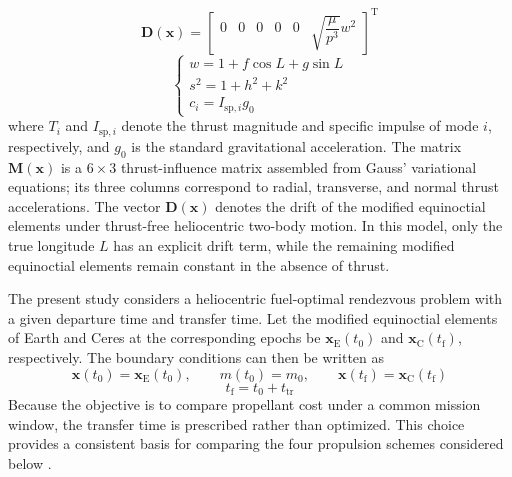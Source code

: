 \documentclass{IEEEtaes}
\begin{document}
\begin{equation}
\bm{D}(\bm{x})=\begin{bmatrix}0&0&0&0&0&\sqrt{\dfrac{\mu}{p^3}}w^2\end{bmatrix}^{\mathrm{T}}
\end{equation}
\begin{equation}
\begin{cases}
w=1+f\cos L+g\sin L\\
s^2=1+h^2+k^2\\
c_i=I_{\mathrm{sp},i}g_0
\end{cases}
\end{equation}
where $T_i$ and $I_{\mathrm{sp},i}$ denote the thrust magnitude and specific impulse of mode $i$, respectively, and $g_0$ is the standard gravitational acceleration. The matrix $\bm{M}(\bm{x})$ is a $6\times3$ thrust-influence matrix assembled from Gauss' variational equations; its three columns correspond to radial, transverse, and normal thrust accelerations. The vector $\bm{D}(\bm{x})$ denotes the drift of the modified equinoctial elements under thrust-free heliocentric two-body motion. In this model, only the true longitude $L$ has an explicit drift term, while the remaining modified equinoctial elements remain constant in the absence of thrust.

The present study considers a heliocentric fuel-optimal rendezvous problem with a given departure time and transfer time. Let the modified equinoctial elements of Earth and Ceres at the corresponding epochs be $\bm{x}_{\mathrm{E}}(t_0)$ and $\bm{x}_{\mathrm{C}}(t_{\mathrm{f}})$, respectively. The boundary conditions can then be written as
\begin{equation}
\bm{x}(t_0)=\bm{x}_{\mathrm{E}}(t_0),\qquad m(t_0)=m_0,\qquad \bm{x}(t_{\mathrm{f}})=\bm{x}_{\mathrm{C}}(t_{\mathrm{f}})
\end{equation}
\begin{equation}
t_{\mathrm{f}}=t_0+t_{\mathrm{tr}}
\end{equation}
Because the objective is to compare propellant cost under a common mission window, the transfer time is prescribed rather than optimized. This choice provides a consistent basis for comparing the four propulsion schemes considered below \cite{chi2022,cline2024a}.
\end{document}
